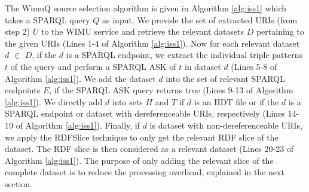 The WimuQ source selection algorithm is given in Algorithm \ref{alg:iss1} which takes a SPARQL query $Q$ as input. We provide the set of extracted URIs (from step 2) $U$ to the WIMU service and retrieve the relevant datasets $D$ pertaining to the given URIs (Lines 1-4 of Algorithm \ref{alg:iss1}). Now for each relevant dataset $d$ $\in$ $D$, if the $d$ is a SPARQL endpoint, we extract the individual triple patterns $t$ of the query and perform a SPARQL ASK of $t$ in dataset $d$ (Lines 5-8 of Algorithm \ref{alg:iss1}). We add the dataset $d$ into the set of relevant SPARQL endpoints $E$, if the SPARQL ASK query returns true (Lines 9-13 of Algorithm \ref{alg:iss1}). We directly add $d$ into sets $H$ and $T$ if $d$ is an HDT file or if the $d$ is a SPARQL endpoint or dataset with dereferenceable URIs, respectively (Lines 14-19 of Algorithm \ref{alg:iss1}). Finally, if $d$ is dataset with non-dereferenceable URIs, we apply the RDFSlice \cite{marx2017torpedo} technique to only get the relevant RDF slice of the dataset. The RDF slice is then considered as a relevant dataset (Lines 20-23 of Algorithm \ref{alg:iss1}). The purpose of only adding the relevant slice of the complete dataset is to reduce the processing overhead, explained in the next section. 



